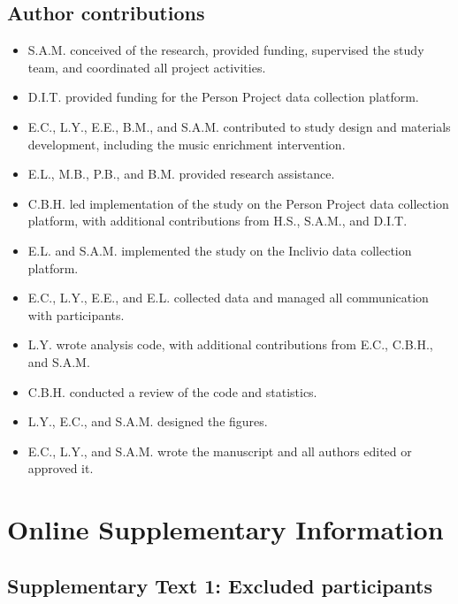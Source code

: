 \documentclass[
]{article}
\providecommand{\tightlist}{%
  \setlength{\itemsep}{0pt}\setlength{\parskip}{0pt}}
\begin{document}
\subsection*{Author contributions}\label{author-contributions}

\begin{itemize}
\tightlist
\item
  S.A.M. conceived of the research, provided funding, supervised the
  study team, and coordinated all project activities.
\item
  D.I.T. provided funding for the Person Project data collection
  platform.
\item
  E.C., L.Y., E.E., B.M., and S.A.M. contributed to study design and
  materials development, including the music enrichment intervention.
\item
  E.L., M.B., P.B., and B.M. provided research assistance.
\item
  C.B.H. led implementation of the study on the Person Project data
  collection platform, with additional contributions from H.S., S.A.M.,
  and D.I.T.
\item
  E.L. and S.A.M. implemented the study on the Inclivio data collection
  platform.
\item
  E.C., L.Y., E.E., and E.L. collected data and managed all
  communication with participants.
\item
  L.Y. wrote analysis code, with additional contributions from E.C.,
  C.B.H., and S.A.M.
\item
  C.B.H. conducted a review of the code and statistics.
\item
  L.Y., E.C., and S.A.M. designed the figures.
\item
  E.C., L.Y., and S.A.M. wrote the manuscript and all authors edited or
  approved it.
\end{itemize}

\newpage

\section*{Online Supplementary
Information}\label{online-supplementary-information}

\subsection*{Supplementary Text 1: Excluded
participants}\label{supplementary-text-1-excluded-participants}
\end{document}
